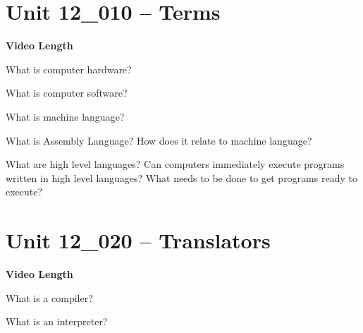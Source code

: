 \documentclass[letterpaper,12pt]{exam}
\newcommand{\unit}{Unit 12}
\begin{document}
\section*{\unit\_010 -- Terms} 
\par{\selectfont\textbf{Video Length}}
\begin{questions}
\begin{samepage}
    \question What is computer hardware?
    \vspace{5mm}
\end{samepage}
\begin{samepage}
    \question What is computer software?
    \vspace{5mm}
\end{samepage}

\begin{samepage}
    \question What is machine language?
    \vspace{5mm}
\end{samepage}

\begin{samepage}
    \question What is Assembly Language?  How does it relate to machine language?
    \vspace{5mm}
\end{samepage}

\begin{samepage}
    \question What are high level languages?  Can computers immediately execute programs written in high level languages?  What needs to be done to get programs ready to execute?
    \vspace{5mm}
\end{samepage}

\section*{\unit\_020 -- Translators} 
\par{\selectfont\textbf{Video Length }}

\begin{samepage}
    \question What is a compiler?
    \vspace{5mm}
\end{samepage}

\begin{samepage}
    \question What is an interpreter?
    \vspace{5mm}
\end{samepage}


\end{questions}
\end{document}
